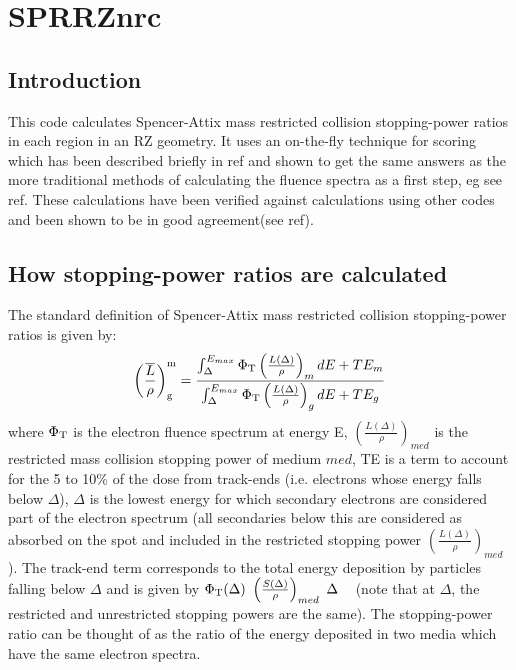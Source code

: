 \documentclass[12pt,twoside]{article}  %
\newcommand{\sprt}[2]{\left(\frac{\overline{L}}{\rho}\right)^{\rm #1}_{\rm #2}}
\newcommand{\eqn}[1]{\begin{equation} #1 \end{equation} }
\newcommand{\rsp}[1]{\left( \frac{L(\Delta)}{\rho} \right)_{#1}}
\newcommand{\PhiT}{\Phi_{\rm T}}
\newcommand{\rspt}[1]{\left( \frac{S(\Delta)}{\rho} \right)_{#1}}
\begin{document}
\section{SPRRZnrc}
\renewcommand{\leftmark}{{SPRRZnrc}}

\subsection{Introduction}

This code calculates Spencer-Attix mass restricted collision stopping-power
ratios in each region in an RZ geometry.  It uses an on-the-fly technique
for scoring which has been described briefly in ref\cite{KR93} and shown to get the
same answers as the more traditional methods of calculating the fluence
spectra as a first step, eg see ref\cite{Ma91}.  These calculations have been verified against
calculations using other codes and been shown to be in good agreement(see
ref\cite{Ma91,KR93}).

\subsection[Calculating SPRs]{How stopping-power ratios are calculated}

The standard definition of Spencer-Attix mass restricted collision
stopping-power
ratios is given by\cite{Ro96,ICRU35}:
\eqn{ \sprt{m}{g} = \frac{\int_{\Delta}^{E_{max}} \PhiT
\rsp{m} dE + TE_{m} } {\int_{\Delta}^{E_{max}} \PhiT \rsp{g} dE + TE_{g} }
\label{eq_sa_spr} }
where $\PhiT$ is the electron fluence spectrum at energy E, $\rsp{med}$ is
the restricted mass collision stopping power of medium $med$,  TE
is a term to account for the 5 to 10\% of the dose from track-ends
(i.e. electrons whose energy falls below $\Delta$), $\Delta$ is the
lowest energy for which secondary electrons are considered part of the
electron spectrum (all secondaries below this are considered as absorbed
on the spot and included in the restricted stopping power $\rsp{med}$).
The track-end term corresponds to the total energy deposition by particles
falling below $\Delta$ and is given by $\PhiT(\Delta)~\rspt{med}~\Delta$
~\cite{ICRU35,Na78} (note that at $\Delta$, the restricted and unrestricted
stopping powers are the same). The stopping-power ratio can be thought of
as the ratio of the energy deposited in two media which have the same
electron spectra.
\end{document}

